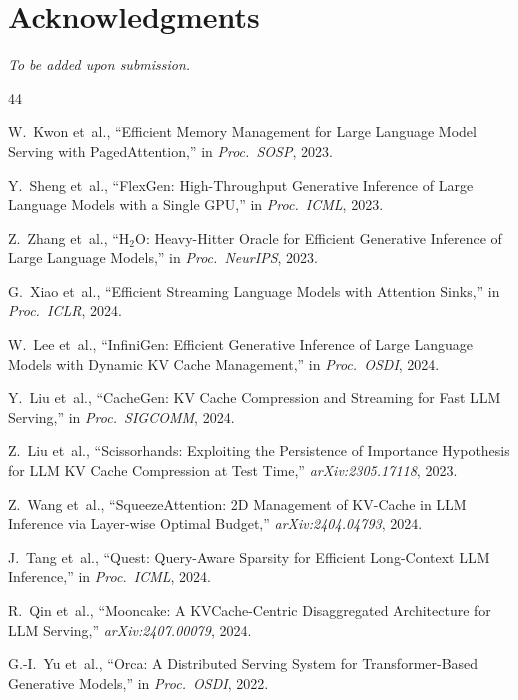 \documentclass[conference]{IEEEtran}
\begin{document}
\section*{Acknowledgments}
\textit{To be added upon submission.}

\balance

\begin{thebibliography}{44}

 W.~Kwon et~al., ``Efficient Memory Management for Large Language Model Serving with PagedAttention,'' in \textit{Proc.\ SOSP}, 2023.

 Y.~Sheng et~al., ``FlexGen: High-Throughput Generative Inference of Large Language Models with a Single GPU,'' in \textit{Proc.\ ICML}, 2023.

 Z.~Zhang et~al., ``H$_2$O: Heavy-Hitter Oracle for Efficient Generative Inference of Large Language Models,'' in \textit{Proc.\ NeurIPS}, 2023.

 G.~Xiao et~al., ``Efficient Streaming Language Models with Attention Sinks,'' in \textit{Proc.\ ICLR}, 2024.

 W.~Lee et~al., ``InfiniGen: Efficient Generative Inference of Large Language Models with Dynamic KV Cache Management,'' in \textit{Proc.\ OSDI}, 2024.

 Y.~Liu et~al., ``CacheGen: KV Cache Compression and Streaming for Fast LLM Serving,'' in \textit{Proc.\ SIGCOMM}, 2024.

 Z.~Liu et~al., ``Scissorhands: Exploiting the Persistence of Importance Hypothesis for LLM KV Cache Compression at Test Time,'' \textit{arXiv:2305.17118}, 2023.

 Z.~Wang et~al., ``SqueezeAttention: 2D Management of KV-Cache in LLM Inference via Layer-wise Optimal Budget,'' \textit{arXiv:2404.04793}, 2024.

 J.~Tang et~al., ``Quest: Query-Aware Sparsity for Efficient Long-Context LLM Inference,'' in \textit{Proc.\ ICML}, 2024.

 R.~Qin et~al., ``Mooncake: A KVCache-Centric Disaggregated Architecture for LLM Serving,'' \textit{arXiv:2407.00079}, 2024.

 G.-I.~Yu et~al., ``Orca: A Distributed Serving System for Transformer-Based Generative Models,'' in \textit{Proc.\ OSDI}, 2022.


\end{thebibliography}
\end{document}
